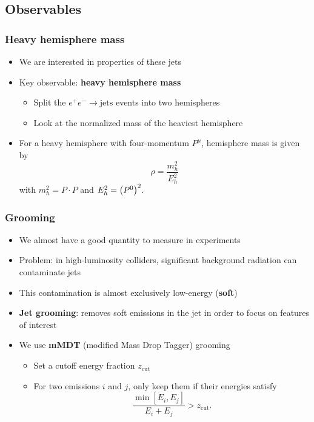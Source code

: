 \documentclass{beamer}
\newcommand{\zcut}{z_\mathrm{cut}}
\begin{document}
\subsection{Observables}
	\begin{frame}
		\frametitle{Heavy hemisphere mass}

		\begin{itemize}
			\item We are interested in properties of these jets

			\item Key observable: \textbf{heavy hemisphere mass}
			\begin{itemize}
				\item Split the $e^+ e^- \to \text{jets}$ events into two hemispheres

				\item Look at the normalized mass of the heaviest hemisphere
				
			\end{itemize}

			\item For a heavy hemisphere with four-momentum $P^\mu$, hemisphere mass is given by
			\begin{equation*}
				\rho = \frac{m_h^2}{E_h^2}
			\end{equation*}
			with $m_h^2 = P \cdot P$ and $E_h^2 = \qty(P^0)^2$.
		\end{itemize}
	\end{frame}

	\begin{frame}
		\frametitle{Grooming}

		\begin{itemize}
			\item We almost have a good quantity to measure in experiments

			\item Problem: in high-luminosity colliders, significant background radiation can contaminate jets

			\item This contamination is almost exclusively low-energy (\textbf{soft})

			\item \textbf{Jet grooming}: removes soft emissions in the jet in order to focus on features of interest
			
			\item We use \textbf{mMDT} (modified Mass Drop Tagger) grooming \cite{dasgupta_towards_2013,kardos_two-_2020}
			\begin{itemize}
				\item Set a cutoff energy fraction $\zcut$

				\item For two emissions $i$ and $j$, only keep them if their energies satisfy
				\begin{equation*}
					\frac{\min[E_i, E_j]}{E_i + E_j} > \zcut.
				\end{equation*}
			\end{itemize}
		\end{itemize}
	\end{frame}
\end{document}
